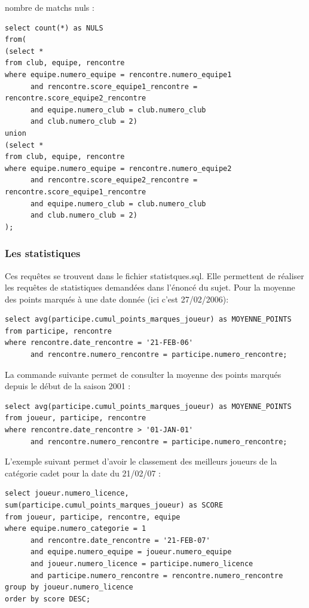 \documentclass{article}
\begin{document}
nombre de matchs nuls : \\

\begin{verbatim}
select count(*) as NULS
from(
(select *
from club, equipe, rencontre
where equipe.numero_equipe = rencontre.numero_equipe1 
      and rencontre.score_equipe1_rencontre = rencontre.score_equipe2_rencontre
      and equipe.numero_club = club.numero_club
      and club.numero_club = 2)
union
(select *
from club, equipe, rencontre 
where equipe.numero_equipe = rencontre.numero_equipe2
      and rencontre.score_equipe2_rencontre = rencontre.score_equipe1_rencontre
      and equipe.numero_club = club.numero_club
      and club.numero_club = 2)
);
\end{verbatim}

\subsubsection{Les statistiques}
Ces requêtes se trouvent dans le fichier statistques.sql. Elle permettent de réaliser les requêtes de statistiques demandées dans l'énoncé du sujet.
Pour la moyenne des points marqués à une date donnée (ici c'est 27/02/2006): \\

\begin{verbatim}
select avg(participe.cumul_points_marques_joueur) as MOYENNE_POINTS
from participe, rencontre
where rencontre.date_rencontre = '21-FEB-06'
      and rencontre.numero_rencontre = participe.numero_rencontre;
\end{verbatim}

La commande suivante permet de consulter la moyenne des points marqués depuis le début de la saison 2001 : \\

\begin{verbatim}
select avg(participe.cumul_points_marques_joueur) as MOYENNE_POINTS
from joueur, participe, rencontre
where rencontre.date_rencontre > '01-JAN-01'
      and rencontre.numero_rencontre = participe.numero_rencontre;
\end{verbatim}

L'exemple suivant permet d'avoir le classement des meilleurs joueurs de la catégorie cadet pour la date du 21/02/07 : \\

\begin{verbatim}
select joueur.numero_licence, sum(participe.cumul_points_marques_joueur) as SCORE
from joueur, participe, rencontre, equipe
where equipe.numero_categorie = 1
      and rencontre.date_rencontre = '21-FEB-07'
      and equipe.numero_equipe = joueur.numero_equipe
      and joueur.numero_licence = participe.numero_licence
      and participe.numero_rencontre = rencontre.numero_rencontre
group by joueur.numero_licence 
order by score DESC;
\end{verbatim}
\end{document}
